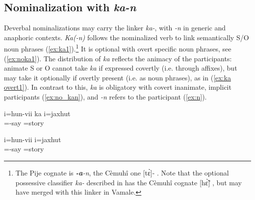 \subsection{Nominalization with \textit{ka-n}}
\label{kan}
Deverbal nominalizations may carry the linker \textit{ka-}, with \textit{-n}  in generic and anaphoric contexts. \textit{Ka(-n)} follows the nominalized verb to link semantically S/O noun phrases (\ref{ex:ka1}).\footnote{The Pije cognate is \textit{\textbf{-a}-n}, the Cèmuhî one {[tɛ̀]}- \parencite[273]{rivierre_langue_1980}. Note that the optional possessive classifier \textit{ka-} described in  has the Cèmuhî cognate {[hɛ̃̀]} \parencite[271]{rivierre_langue_1980}, but may have merged with this linker in Vamale.} It is optional with overt specific noun phrases, see (\ref{ex:noka1}). The distribution of \textit{ka} reflects the animacy of the participants: animate S or O cannot take \textit{ka} if expressed covertly (i.e. through affixes), but may take it optionally if overtly present (i.e. as noun phrases), as in (\ref{ex:ka overt1}). In contrast to this, \textit{ka} is obligatory with covert inanimate, implicit participants (\ref{ex:no_kan}), and \textit{-n} refers to the participant (\ref{ex:n}).



	\ea \label{ex:ka1}
	\gll i=hun-vii ka i=jaxhut\\
	 =-say  =story	\\
	\glt {}	
	\z
	
	\ea \label{ex:noka1}
	\gll i=hun-vii i=jaxhut\\
	 =-say =story\\	
	\glt {}	
	\z


%
%
%
%
%

